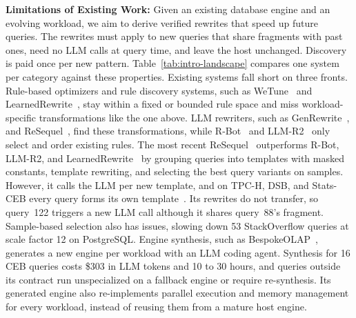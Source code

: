 \textbf{Limitations of Existing Work:} Given an existing database engine and an evolving workload, we aim to derive verified rewrites that speed up future queries.
The rewrites must apply to new queries that share fragments with past ones, need no LLM calls at query time, and leave the host unchanged.
Discovery is paid once per new pattern.
Table~\ref{tab:intro-landscape} compares one system per category against these properties.
%
Existing systems fall short on three fronts.
Rule-based optimizers and rule discovery systems, such as WeTune~\cite{WeTune} and LearnedRewrite~\cite{learnedrewrite}, stay within a fixed or bounded rule space and miss workload-specific transformations like the one above.
LLM rewriters, such as GenRewrite~\cite{GenRewrite},  and ReSequel~\cite{resequel}, find these transformations, while R-Bot~\cite{RBot} and LLM-R2~\cite{LLMR2} only select and order existing rules.
The most recent ReSequel~\cite{resequel} outperforms R-Bot, LLM-R2, and LearnedRewrite~\cite{resequel} by grouping queries into templates with masked constants, template rewriting, and selecting the best query variants on samples.
However, it calls the LLM per new template, and on TPC-H, DSB, and Stats-CEB every query forms its own template~\cite{resequel}.
Its rewrites do not transfer, so query~122 triggers a new LLM call although it shares query~88's fragment.
Sample-based selection also has issues, slowing down 53 StackOverflow queries at scale factor 12 on PostgreSQL.
%
Engine synthesis, such as BespokeOLAP~\cite{bespokeolap}, generates a new engine per workload with an LLM coding agent.
Synthesis for 16 CEB queries costs \$303 in LLM tokens and 10 to 30 hours, and queries outside its contract run unspecialized on a fallback engine or require re-synthesis.
Its generated engine also re-implements parallel execution and memory management for every workload, instead of reusing them from a mature host engine.\shorten


